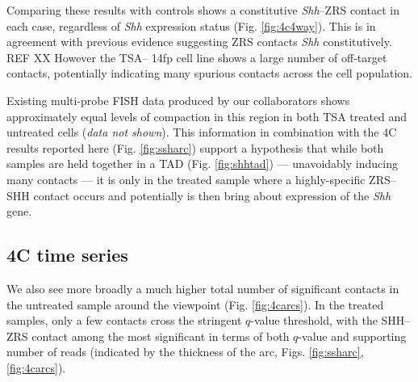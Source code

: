 \documentclass[a4paper,11pt,oneside]{book}
\begin{document}
Comparing these results with controls shows a constitutive \emph{Shh}--ZRS contact in each case, regardless of \emph{Shh} expression status (Fig. \ref{fig:4c4way}). This is in agreement with previous evidence suggesting ZRS contacts \emph{Shh} constitutively.\cite{Bouwman2015a} REF XX However the TSA-- 14fp cell line shows a large number of off-target contacts, potentially indicating many spurious contacts across the cell population.

Existing multi-probe FISH data produced by our collaborators shows approximately equal levels of compaction in this region in both TSA treated and untreated cells (\emph{data not shown}). This information in combination with the 4C results reported here (Fig. \ref{fig:ssharc}) support a hypothesis that while both samples are held together in a TAD (Fig. \ref{fig:shhtad}) --- unavoidably inducing many contacts --- it is only in the treated sample where a highly-specific ZRS--SHH contact occurs and potentially is then bring about expression of the \emph{Shh} gene.

\subsection{4C time series}

We also see more broadly a much higher total number of significant contacts in the untreated sample around the viewpoint (Fig. \ref{fig:4carcs}). In the treated samples, only a few contacts cross the stringent $q$-value threshold, with the SHH--ZRS contact among the most significant in terms of both $q$-value and supporting number of reads (indicated by the thickness of the arc, Figs. \ref{fig:ssharc}, \ref{fig:4carcs}).



\end{document}
